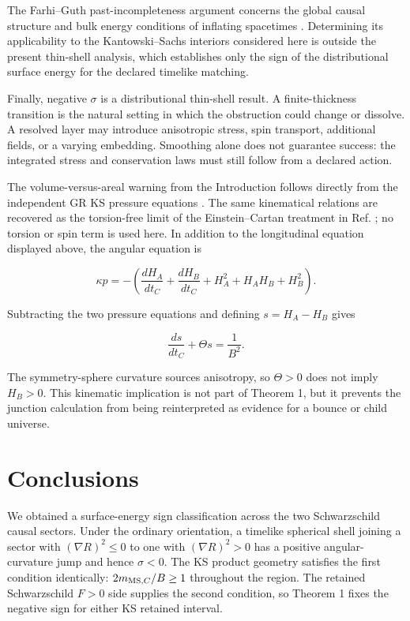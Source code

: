\documentclass[pdflatex,sn-mathphys-num]{sn-jnl}
\begin{document}
The Farhi--Guth past-incompleteness argument concerns the global causal structure and bulk energy conditions of inflating spacetimes \cite{ref3}. Determining its applicability to the Kantowski--Sachs interiors considered here is outside the present thin-shell analysis, which establishes only the sign of the distributional surface energy for the declared timelike matching.


Finally, negative \(\sigma\) is a distributional thin-shell result. A finite-thickness transition is the natural setting in which the obstruction could change or dissolve. A resolved layer may introduce anisotropic stress, spin transport, additional fields, or a varying embedding. Smoothing alone does not guarantee success: the integrated stress and conservation laws must still follow from a declared action.


The volume-versus-areal warning from the Introduction follows directly from the independent GR KS pressure equations \cite{ref11}. The same kinematical relations are recovered as the torsion-free limit of the Einstein--Cartan treatment in Ref. \cite{ref10}; no torsion or spin term is used here. In addition to the longitudinal equation displayed above, the angular equation is


\[
\kappa p=-\left(
\frac{dH_A}{dt_C}+\frac{dH_B}{dt_C}
+H_A^2+H_AH_B+H_B^2
\right).
\]

Subtracting the two pressure equations and defining \(s=H_A-H_B\) gives


\begin{equation}
\frac{ds}{dt_C}+\Theta s=\frac{1}{B^2}.
\tag{54}
\end{equation}

The symmetry-sphere curvature sources anisotropy, so \(\Theta>0\) does not imply \(H_B>0\). This kinematic implication is not part of Theorem 1, but it prevents the junction calculation from being reinterpreted as evidence for a bounce or child universe.


\section{Conclusions}

We obtained a surface-energy sign classification across the two Schwarzschild causal sectors. Under the ordinary orientation, a timelike spherical shell joining a sector with \((\nabla R)^2\le0\) to one with \((\nabla R)^2>0\) has a positive angular-curvature jump and hence \(\sigma<0\). The KS product geometry satisfies the first condition identically: \(2m_{{\rm MS},C}/B\ge1\) throughout the region. The retained Schwarzschild \(F>0\) side supplies the second condition, so Theorem 1 fixes the negative sign for either KS retained interval.
\end{document}
